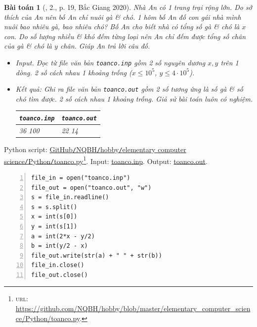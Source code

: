\documentclass{article}
\newtheorem{baitoan}{Bài toán}
\begin{document}
\begin{baitoan}[\cite{VietSTEM2021}, 2., p. 19, Bắc Giang 2020]
	Nhà An có 1 trang trại rộng lớn. Do sở thích của An nên bố An chỉ nuôi gà \& chó. 1 hôm bố An đố con gái nhà mình nuôi bao nhiêu gà, bao nhiêu chó? Bố An cho biết nhà có tổng số gà \& chó là $x$ con. Do số lượng nhiều \& khó đếm từng loại nên An chỉ đếm được tổng số chân của gà \& chó là $y$ chân. Giúp An trả lời câu đố.
	\begin{itemize}
		\item {\sf Input.} Đọc từ file văn bản \verb|toanco.inp| gồm 2 số nguyên dương $x,y$ trên 1 dòng. 2 số cách nhau 1 khoảng trống ($x\le10^5$, $y\le4\cdot10^5$).
		\item {\sf Kết quả:} Ghi ra file văn bản \verb|toanco.out| gồm 2 số tương ứng là số gà \& số chó tìm được. 2 số cách nhau 1 khoảng trống. Giả sử bài toán luôn có nghiệm.
		\begin{table}[H]
			\centering
			\begin{tabular}{|l|l|}
				\hline
				{\tt toanco.inp} & {\tt toanco.out} \\
				\hline
				36 100 & 22 14 \\
				\hline
			\end{tabular}
		\end{table}
	\end{itemize}
\end{baitoan}
Python script: \href{https://github.com/NQBH/hobby/blob/master/elementary_computer_science/Python/toanco.py}{GitHub{\tt /}NQBH{\tt /}hobby{\tt /}elementary computer science{\tt /}Python{\tt /}toanco.py}\footnote{\textsc{url}: \url{https://github.com/NQBH/hobby/blob/master/elementary_computer_science/Python/toanco.py}.}. Input: \href{https://github.com/NQBH/hobby/blob/master/elementary_computer_science/Python/toanco.inp}{toanco.inp}. Output: \href{https://github.com/NQBH/hobby/blob/master/elementary_computer_science/Python/toanco.out}{toanco.out}.
\begin{Verbatim}[numbers=left,xleftmargin=5mm]
file_in = open("toanco.inp")
file_out = open("toanco.out", "w")
s = file_in.readline()
s = s.split()
x = int(s[0])
y = int(s[1])
a = int(2*x - y/2)
b = int(y/2 - x)
file_out.write(str(a) + " " + str(b))
file_in.close()
file_out.close()
\end{Verbatim}
\end{document}

